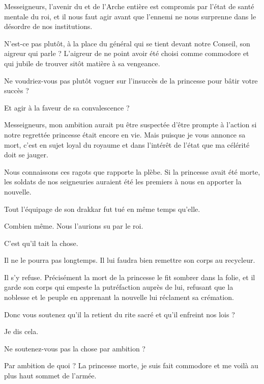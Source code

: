 \begin{drama}
  \generalspeaks Messeigneurs, l’avenir du \campprincipal{} et de l’Arche entière est compromis par l’état de santé mentale du roi,  et il nous faut agir avant que l’ennemi ne nous surprenne dans le désordre de nos institutions.

  \nobleOnespeaks N’est-ce pas plutôt, à la place du  général qui se tient devant notre Conseil, son aigreur qui parle ? L’aigreur de ne point avoir été choisi comme commodore et qui jubile de trouver sitôt matière à sa vengeance.

  \nobleTwospeaks Ne voudriez-vous pas plutôt voguer sur l’insuccès de la princesse pour bâtir votre succès ?

  \nobleTreespeaks Et agir à la faveur de sa convalescence ?

  \generalspeaks Messeigneurs, mon  ambition aurait pu être suspectée  d’être prompte à l’action si notre regrettée princesse était encore en vie. Mais puisque je vous annonce sa mort, c’est en sujet loyal du royaume et dans l’intérêt de l’état que ma célérité doit se jauger.

  \nobleOnespeaks Nous connaissons ces ragots que rapporte la plèbe. Si la princesse avait été morte, les soldats de nos seigneuries auraient été les premiers à nous en apporter la nouvelle.

  \generalspeaks Tout l’équipage de son drakkar fut tué en même temps qu’elle.

  \nobleTwospeaks Combien même. Nous l’aurions su par le roi.

  \generalspeaks C’est qu’il tait la chose.

  \nobleTreespeaks Il ne le pourra pas longtemps. Il lui faudra bien remettre son corps au recycleur.

  \generalspeaks Il s’y refuse. Précisément la mort de la princesse le fit sombrer dans la folie, et il garde son corps qui empeste la putréfaction auprès de lui, refusant que la noblesse et le peuple en apprenant la nouvelle lui réclament sa crémation.

  \nobleTreespeaks Donc vous soutenez qu’il la retient du rite sacré et qu’il enfreint nos lois ?

  \generalspeaks Je dis cela.

  \nobleTwospeaks Ne soutenez-vous pas la chose par ambition ?

  \generalspeaks Par ambition de quoi ? La princesse morte, je suis fait commodore et me voilà au plus haut sommet de l’armée.


\end{drama}
